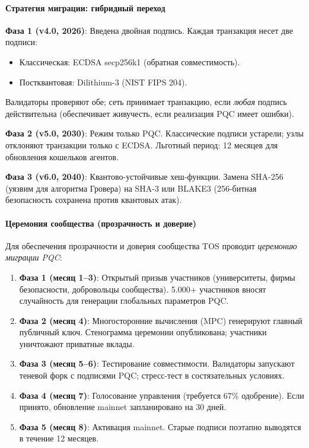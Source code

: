 \documentclass[11pt]{article}
\begin{document}
\paragraph{Стратегия миграции: гибридный переход}
\textbf{Фаза 1 (v4.0, 2026)}: Введена двойная подпись. Каждая транзакция несет две подписи:
\begin{itemize}[noitemsep]
  \item Классическая: ECDSA secp256k1 (обратная совместимость).
  \item Постквантовая: Dilithium-3 (NIST FIPS 204).
\end{itemize}
Валидаторы проверяют обе; сеть принимает транзакцию, если \emph{любая} подпись действительна (обеспечивает живучесть, если реализация PQC имеет ошибки).

\textbf{Фаза 2 (v5.0, 2030)}: Режим только PQC. Классические подписи устарели; узлы отклоняют транзакции только с ECDSA. Льготный период: 12 месяцев для обновления кошельков агентов.

\textbf{Фаза 3 (v6.0, 2040)}: Квантово-устойчивые хеш-функции. Замена SHA-256 (уязвим для алгоритма Гровера) на SHA-3 или BLAKE3 (256-битная безопасность сохранена против квантовых атак).

\paragraph{Церемония сообщества (прозрачность и доверие)}
Для обеспечения прозрачности и доверия сообщества TOS проводит \emph{церемонию миграции PQC}:
\begin{enumerate}[noitemsep]
  \item \textbf{Фаза 1 (месяц 1--3)}: Открытый призыв участников (университеты, фирмы безопасности, добровольцы сообщества). 5.000+ участников вносят случайность для генерации глобальных параметров PQC.
  \item \textbf{Фаза 2 (месяц 4)}: Многосторонние вычисления (MPC) генерируют главный публичный ключ. Стенограмма церемонии опубликована; участники уничтожают приватные вклады.
  \item \textbf{Фаза 3 (месяц 5--6)}: Тестирование совместимости. Валидаторы запускают теневой форк с подписями PQC; стресс-тест в состязательных условиях.
  \item \textbf{Фаза 4 (месяц 7)}: Голосование управления (требуется 67\% одобрение). Если принято, обновление mainnet запланировано на 30 дней.
  \item \textbf{Фаза 5 (месяц 8)}: Активация mainnet. Старые подписи поэтапно выводятся в течение 12 месяцев.
\end{enumerate}
\end{document}
